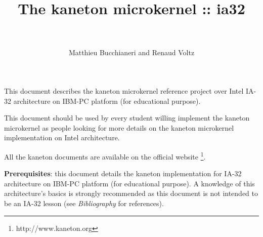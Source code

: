 %
%
%
%
%
%

%
%

\def\path{../../..}

%
%



%
%

\rhead{}

%
%

\title{The kaneton microkernel :: ia32 \\
       \version \\
       \logos}

%
%

\author{\small{Matthieu Bucchianeri} and
        \small{Renaud Voltz}}

%
%



%
%

\maketitle

%
%

This document describes the kaneton microkernel reference project over
Intel IA-32 architecture on IBM-PC platform (for educational purpose).

\-

This document should be used by every student willing implement the
kaneton microkernel as people looking for more details on the kaneton
microkernel implementation on Intel architecture.

\-

All the kaneton documents are available on
the official website
  \footnote{http://www.kaneton.org}.

\-

\textbf{Prerequisites}: this document details the kaneton implementation
for IA-32 architecture on IBM-PC platform (for educational purpose). A
knowledge of this architecture's basics is strongly recommended as
this document is not intended to be an IA-32 lesson (see
\textit{Bibliography} for references).

%
%

\toc

%
%













